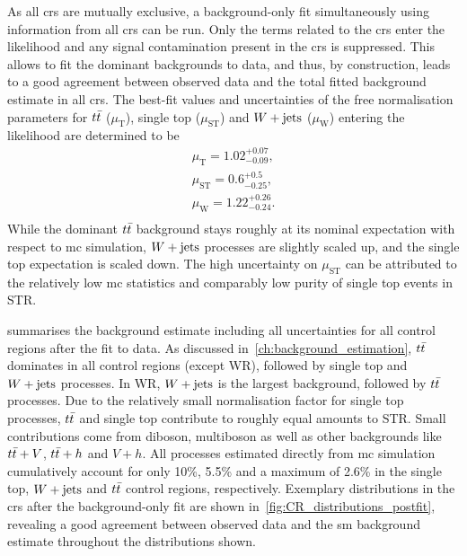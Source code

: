 As all \glspl{cr} are mutually exclusive, a background-only fit simultaneously using information from all \glspl{cr} can be run. Only the terms related to the \glspl{cr} enter the likelihood and any signal contamination present in the \glspl{cr} is suppressed. This allows to fit the dominant backgrounds to data, and thus, by construction, leads to a good agreement between observed data and the total fitted background estimate in all \glspl{cr}. The best-fit values and uncertainties of the free normalisation parameters for $t\bar{t}$ ($\mu_\mathrm{T}$), single top ($\mu_\mathrm{ST}$) and $W+\mathrm{jets}$ ($\mu_\mathrm{W}$) entering the likelihood are determined to be
\begin{equation}
	\begin{split}
		\mu_\mathrm{T} = 1.02^{+0.07}_{-0.09}, \\
		\mu_\mathrm{ST} = 0.6^{+0.5}_{-0.25}, \\
		\mu_\mathrm{W} = 1.22^{+0.26}_{-0.24}. \\
	\end{split}
\end{equation}
While the dominant $t\bar{t}$ background stays roughly at its nominal expectation with respect to \gls{mc} simulation, $W+\mathrm{jets}$ processes are slightly scaled up, and the single top expectation is scaled down. The high uncertainty on $\mu_\mathrm{ST}$ can be attributed to the relatively low \gls{mc} statistics and comparably low purity of single top events in STR.

 summarises the background estimate including all uncertainties for all control regions after the fit to data. As discussed in~\cref{ch:background_estimation}, $t\bar{t}$ dominates in all control regions (except WR), followed by single top and $W+\mathrm{jets}$ processes. In WR, $W+\mathrm{jets}$ is the largest background, followed by $t\bar{t}$ processes. Due to the relatively small normalisation factor for single top processes, $t\bar{t}$ and single top contribute to roughly equal amounts to STR. Small contributions come from diboson, multiboson as well as other backgrounds like $t\bar{t}+V$, $t\bar{t}+h$ and $V+h$. All processes estimated directly from \gls{mc} simulation cumulatively account for only 10\%, 5.5\% and a maximum of 2.6\% in the single top, $W+\mathrm{jets}$ and $t\bar{t}$ control regions, respectively. Exemplary distributions in the \glspl{cr} after the background-only fit are shown in~\cref{fig:CR_distributions_postfit}, revealing a good agreement between observed data and the \gls{sm} background estimate throughout the distributions shown.

